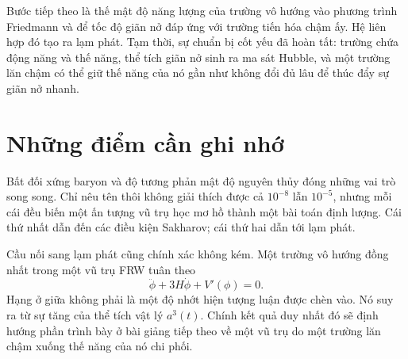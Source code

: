 Bước tiếp theo là thế mật độ năng lượng của trường vô hướng vào phương trình Friedmann và để tốc độ giãn nở đáp ứng với trường tiến hóa chậm ấy. Hệ liên hợp đó tạo ra lạm phát. Tạm thời, sự chuẩn bị cốt yếu đã hoàn tất: trường chứa động năng và thế năng, thể tích giãn nở sinh ra ma sát Hubble, và một trường lăn chậm có thể giữ thế năng của nó gần như không đổi đủ lâu để thúc đẩy sự giãn nở nhanh.

\section{Những điểm cần ghi nhớ}

Bất đối xứng baryon và độ tương phản mật độ nguyên thủy đóng những vai trò song song. Chỉ nêu tên thôi không giải thích được cả \(10^{-8}\) lẫn \(10^{-5}\), nhưng mỗi cái đều biến một ấn tượng vũ trụ học mơ hồ thành một bài toán định lượng. Cái thứ nhất dẫn đến các điều kiện Sakharov; cái thứ hai dẫn tới lạm phát.

Cầu nối sang lạm phát cũng chính xác không kém. Một trường vô hướng đồng nhất trong một vũ trụ FRW tuân theo
\[
\ddot\phi+3H\dot\phi+V'(\phi)=0.
\]
Hạng ở giữa không phải là một độ nhớt hiện tượng luận được chèn vào. Nó suy ra từ sự tăng của thể tích vật lý \(a^3(t)\). Chính kết quả duy nhất đó sẽ định hướng phần trình bày ở bài giảng tiếp theo về một vũ trụ do một trường lăn chậm xuống thế năng của nó chi phối.
